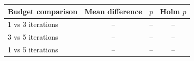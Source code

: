 \begin{tabular}{p{}ccc}
\toprule
Budget comparison & Mean difference & $p$ & Holm $p$ \\
\midrule
1 vs 3 iterations & -- & -- & -- \\
3 vs 5 iterations & -- & -- & -- \\
1 vs 5 iterations & -- & -- & -- \\
\bottomrule
\end{tabular}

